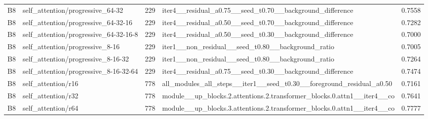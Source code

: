 {\begin{longtable}{>{\raggedright\arraybackslash}p{1.40cm}>{\raggedright\arraybackslash}p{3.67cm}r>{\raggedright\arraybackslash}p{5.74cm}r}
B8 & self\_\allowbreak{}attention/\allowbreak{}progressive\_\allowbreak{}64-32 & 229 & iter4\_\allowbreak{}\_\allowbreak{}residual\_\allowbreak{}a0.75\_\allowbreak{}\_\allowbreak{}seed\_\allowbreak{}t0.70\_\allowbreak{}\_\allowbreak{}background\_\allowbreak{}difference & 0.7558 \\
B8 & self\_\allowbreak{}attention/\allowbreak{}progressive\_\allowbreak{}64-32-16 & 229 & iter4\_\allowbreak{}\_\allowbreak{}residual\_\allowbreak{}a0.50\_\allowbreak{}\_\allowbreak{}seed\_\allowbreak{}t0.70\_\allowbreak{}\_\allowbreak{}background\_\allowbreak{}difference & 0.7282 \\
B8 & self\_\allowbreak{}attention/\allowbreak{}progressive\_\allowbreak{}64-32-16-8 & 229 & iter4\_\allowbreak{}\_\allowbreak{}residual\_\allowbreak{}a0.50\_\allowbreak{}\_\allowbreak{}seed\_\allowbreak{}t0.30\_\allowbreak{}\_\allowbreak{}background\_\allowbreak{}difference & 0.7000 \\
B8 & self\_\allowbreak{}attention/\allowbreak{}progressive\_\allowbreak{}8-16 & 229 & iter1\_\allowbreak{}\_\allowbreak{}non\_\allowbreak{}residual\_\allowbreak{}\_\allowbreak{}seed\_\allowbreak{}t0.80\_\allowbreak{}\_\allowbreak{}background\_\allowbreak{}ratio & 0.7005 \\
B8 & self\_\allowbreak{}attention/\allowbreak{}progressive\_\allowbreak{}8-16-32 & 229 & iter1\_\allowbreak{}\_\allowbreak{}non\_\allowbreak{}residual\_\allowbreak{}\_\allowbreak{}seed\_\allowbreak{}t0.80\_\allowbreak{}\_\allowbreak{}background\_\allowbreak{}ratio & 0.7264 \\
B8 & self\_\allowbreak{}attention/\allowbreak{}progressive\_\allowbreak{}8-16-32-64 & 229 & iter4\_\allowbreak{}\_\allowbreak{}residual\_\allowbreak{}a0.75\_\allowbreak{}\_\allowbreak{}seed\_\allowbreak{}t0.30\_\allowbreak{}\_\allowbreak{}background\_\allowbreak{}difference & 0.7474 \\
B8 & self\_\allowbreak{}attention/\allowbreak{}r16 & 778 & all\_\allowbreak{}modules\_\allowbreak{}all\_\allowbreak{}steps\_\allowbreak{}\_\allowbreak{}iter1\_\allowbreak{}\_\allowbreak{}seed\_\allowbreak{}t0.30\_\allowbreak{}\_\allowbreak{}foreground\_\allowbreak{}residual\_\allowbreak{}a0.50 & 0.7161 \\
B8 & self\_\allowbreak{}attention/\allowbreak{}r32 & 778 & module\_\allowbreak{}\_\allowbreak{}up\_\allowbreak{}blocks.2.attentions.2.transformer\_\allowbreak{}blocks.0.attn1\_\allowbreak{}\_\allowbreak{}iter4\_\allowbreak{}\_\allowbreak{}co & 0.7641 \\
B8 & self\_\allowbreak{}attention/\allowbreak{}r64 & 778 & module\_\allowbreak{}\_\allowbreak{}up\_\allowbreak{}blocks.3.attentions.2.transformer\_\allowbreak{}blocks.0.attn1\_\allowbreak{}\_\allowbreak{}iter4\_\allowbreak{}\_\allowbreak{}co & 0.7777 \\

\end{longtable}}
